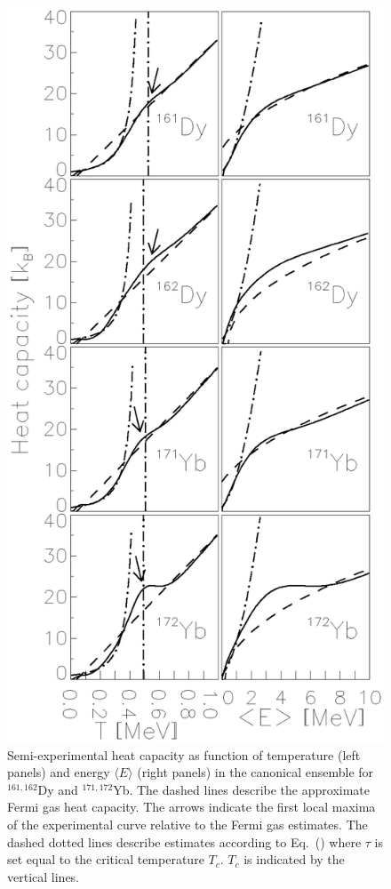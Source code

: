 \begin{figure}\centering
\includegraphics[totalheight=21.5cm]{fig2.eps}
\caption{Semi-experimental heat capacity as function of temperature (left 
panels) and energy $\langle E\rangle$ (right panels) in the canonical ensemble 
for $^{161,162}$Dy and $^{171,172}$Yb. The dashed lines describe the 
approximate Fermi gas heat capacity. The arrows indicate the first local 
maxima of the experimental curve relative to the Fermi gas estimates. The 
dashed dotted lines describe estimates according to Eq.~(\protect{\ref{eq:Tc}})
where $\tau$ is set equal to the critical temperature $T_c$. $T_c$ is indicated
by the vertical lines.}
\label{fig:heatcapacity} 
\end{figure}

